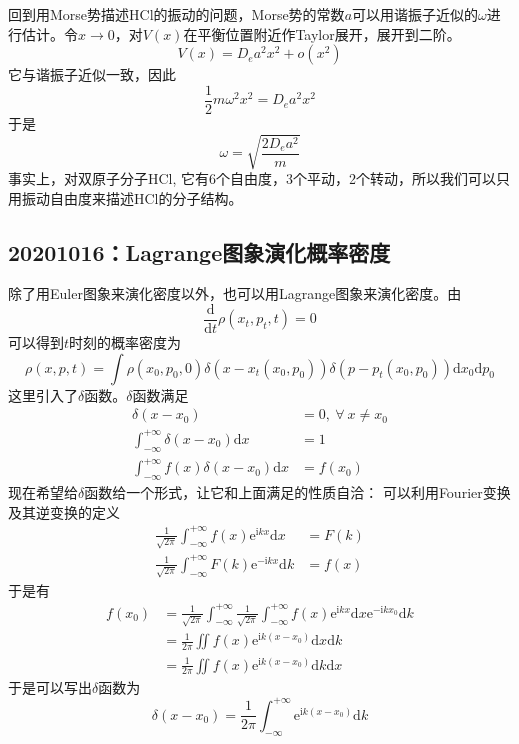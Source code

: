     回到用Morse势描述HCl的振动的问题，Morse势的常数$a$可以用谐振子近似的$\omega$进行估计。令$x \to 0 $，对$V(x)$在平衡位置附近作Taylor展开，展开到二阶。
    \begin{equation*}
        V(x) = D_e a^2 x^2 + o(x^2)
    \end{equation*}
    它与谐振子近似一致，因此
    \begin{equation*}
        \frac 12 m\omega^2x^2 = D_e a^2 x^2
    \end{equation*}
    于是
    \begin{equation*}
        \omega = \sqrt{\frac {2D_ea^2}m}
    \end{equation*}
    事实上，对双原子分子HCl, 它有6个自由度，3个平动，2个转动，所以我们可以只用振动自由度来描述HCl的分子结构。

    \subsection{20201016：Lagrange图象演化概率密度}
    除了用Euler图象来演化密度以外，也可以用Lagrange图象来演化密度。由
    \begin{equation*}
        \frac {\mathrm{d}}{\mathrm{d}t} \rho(x_t,p_t,t) = 0
    \end{equation*}
    可以得到$t$时刻的概率密度为
    \begin{equation*}
        \rho(x,p,t) = \int \rho(x_0,p_0,0)\delta(x-x_t(x_0,p_0)) \delta(p-p_t(x_0,p_0)) \mathrm{d}x_0\mathrm{d}p_0
    \end{equation*}
    这里引入了$\delta$函数。$\delta$函数满足
    \begin{align*}
        \delta(x-x_0) &= 0, \ \forall \ x \neq x_0\\
        \int_{-\infty}^{+\infty} \delta(x-x_0) \mathrm{d}x &= 1\\
        \int_{-\infty}^{+\infty} f(x)\delta(x-x_0) \mathrm{d}x &= f(x_0)
    \end{align*}
    现在希望给$\delta$函数给一个形式，让它和上面满足的性质自洽：
    可以利用Fourier变换及其逆变换的定义
    \begin{align*}
        \frac 1{\sqrt{2\pi}} \int_{-\infty}^{+\infty} f(x)\mathrm{e}^{\mathrm{i}kx}\mathrm{d}x &= F(k)\\
        \frac 1{\sqrt{2\pi}} \int_{-\infty}^{+\infty} F(k)\mathrm{e}^{-\mathrm{i}kx}\mathrm{d}k &= f(x)
    \end{align*}
    于是有
    \begin{align*}
        f(x_0) &= \frac 1{\sqrt{2\pi}} \int_{-\infty}^{+\infty} \frac 1{\sqrt{2\pi}} \int_{-\infty}^{+\infty} f(x)\mathrm{e}^{\mathrm{i}kx}\mathrm{d}x \mathrm{e}^{-\mathrm{i}kx_0}\mathrm{d}k\\
        &= \frac 1{2\pi} \iint f(x)\mathrm{e}^{\mathrm{i}k(x-x_0)}\mathrm{d}x\mathrm{d}k\\
        &= \frac 1{2\pi} \iint f(x)\mathrm{e}^{\mathrm{i}k(x-x_0)}\mathrm{d}k\mathrm{d}x
    \end{align*}
    于是可以写出$\delta$函数为
    \begin{equation*}
        \delta(x-x_0) = \frac 1{2\pi} \int_{-\infty}^{+\infty} \mathrm{e}^{\mathrm{i}k(x-x_0)}\mathrm{d}k
    \end{equation*}

